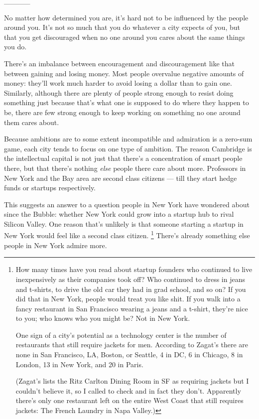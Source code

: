 \documentclass[12pt]{book}
\begin{document}
\_\_\_\_\_

No matter how determined you are, it's hard not to be influenced by the
people around you. It's not so much that you do whatever a city expects
of you, but that you get discouraged when no one around you cares about
the same things you do.

There's an imbalance between encouragement and discouragement like that
between gaining and losing money. Most people overvalue negative amounts
of money: they'll work much harder to avoid losing a dollar than to gain
one. Similarly, although there are plenty of people strong enough to
resist doing something just because that's what one is supposed to do
where they happen to be, there are few strong enough to keep working on
something no one around them cares about.

Because ambitions are to some extent incompatible and admiration is a
zero-sum game, each city tends to focus on one type of ambition. The
reason Cambridge is the intellectual capital is not just that there's a
concentration of smart people there, but that there's nothing
\emph{else} people there care about more. Professors in New York and the
Bay area are second class citizens --- till they start hedge funds or
startups respectively.

This suggests an answer to a question people in New York have wondered
about since the Bubble: whether New York could grow into a startup hub
to rival Silicon Valley. One reason that's unlikely is that someone
starting a startup in New York would feel like a second class citizen.
\footnote{How many times have you read about startup founders who
continued to live inexpensively as their companies took off? Who
continued to dress in jeans and t-shirts, to drive the old car they had
in grad school, and so on? If you did that in New York, people would
treat you like shit. If you walk into a fancy restaurant in San
Francisco wearing a jeans and a t-shirt, they're nice to you; who knows
who you might be? Not in New York.

One sign of a city's potential as a technology center is the number of
restaurants that still require jackets for men. According to Zagat's
there are none in San Francisco, LA, Boston, or Seattle, 4 in DC, 6 in
Chicago, 8 in London, 13 in New York, and 20 in Paris.

(Zagat's lists the Ritz Carlton Dining Room in SF as requiring jackets
but I couldn't believe it, so I called to check and in fact they don't.
Apparently there's only one restaurant left on the entire West Coast
that still requires jackets: The French Laundry in Napa Valley.)} There's already something else people in New
York admire more.
\end{document}
